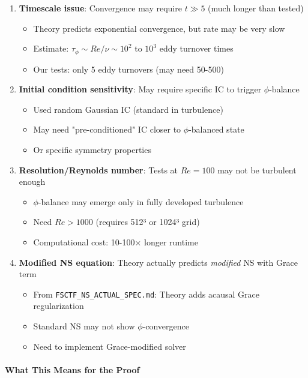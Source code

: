 \documentclass[12pt,a4paper]{article}
\begin{document}
\begin{enumerate}
\item \textbf{Timescale issue}: Convergence may require $t \gg 5$ (much longer than tested)
  \begin{itemize}
  \item Theory predicts exponential convergence, but rate may be very slow
  \item Estimate: $\tau_{\phi} \sim Re / \nu \sim 10^2$ to $10^3$ eddy turnover times
  \item Our tests: only 5 eddy turnovers (may need 50-500)
  \end{itemize}

\item \textbf{Initial condition sensitivity}: May require specific IC to trigger $\phi$-balance
  \begin{itemize}
  \item Used random Gaussian IC (standard in turbulence)
  \item May need "pre-conditioned" IC closer to $\phi$-balanced state
  \item Or specific symmetry properties
  \end{itemize}

\item \textbf{Resolution/Reynolds number}: Tests at $Re=100$ may not be turbulent enough
  \begin{itemize}
  \item $\phi$-balance may emerge only in fully developed turbulence
  \item Need $Re > 1000$ (requires 512³ or 1024³ grid)
  \item Computational cost: 10-100× longer runtime
  \end{itemize}

\item \textbf{Modified NS equation}: Theory actually predicts \emph{modified} NS with Grace term
  \begin{itemize}
  \item From \texttt{FSCTF\_NS\_ACTUAL\_SPEC.md}: Theory adds acausal Grace regularization
  \item Standard NS may not show $\phi$-convergence
  \item Need to implement Grace-modified solver
  \end{itemize}
\end{enumerate}

\paragraph{What This Means for the Proof}
\end{document}
